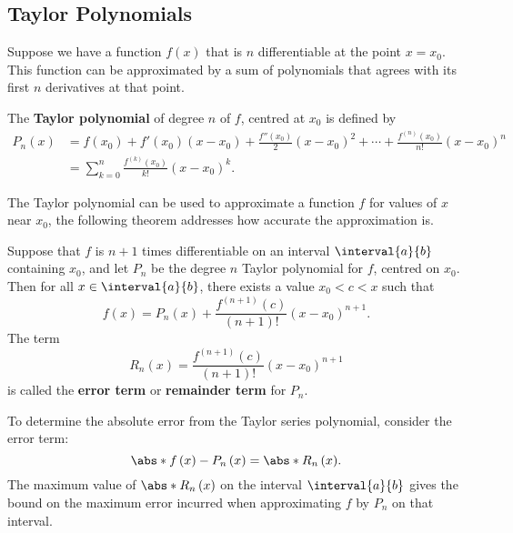\documentclass{article}
\begin{document}
\subsection{Taylor Polynomials}
Suppose we have a function \(f\left( x \right)\) that is \(n\) differentiable at the point
\(x = x_0\). This function can be approximated by a sum of polynomials that agrees with its first \(n\) derivatives at that point.
\begin{definition}
    The \textbf{Taylor polynomial} of degree \(n\) of \(f\), centred at \(x_0\) is defined by
    \begin{align*}
        P_n\left( x \right) & = f\left( x_0 \right) + f'\left( x_0 \right) \left( x - x_0 \right) + \frac{f''\left( x_0 \right)}{2} \left( x - x_0 \right)^2 + \cdots + \frac{f^{\left( n \right)} \left( x_0 \right)}{n!} \left( x - x_0 \right)^n \\
                            & = \sum_{k = 0}^n \frac{f^{\left( k \right)}\left( x_0 \right)}{k!} \left( x - x_0 \right)^k.
    \end{align*}
\end{definition}
The Taylor polynomial can be used to approximate a function \(f\) for values of \(x\) near \(x_0\), the following
theorem addresses how accurate the approximation is.
\begin{definition}
    Suppose that \(f\) is \(n + 1\) times differentiable on an interval \(\interval{a}{b}\) containing \(x_0\),
    and let \(P_n\) be the degree \(n\) Taylor polynomial for \(f\), centred on \(x_0\). Then for all \(x \in \interval{a}{b}\),
    there exists a value \(x_0 < c < x\) such that
    \begin{equation*}
        f\left( x \right) = P_n\left( x \right) + \frac{f^{\left( n + 1 \right)}\left( c \right)}{\left( n + 1 \right)!} \left( x - x_0 \right)^{n + 1}.
    \end{equation*}
    The term
    \begin{equation*}
        R_n\left( x \right) = \frac{f^{\left( n + 1 \right)}\left( c \right)}{\left( n + 1 \right)!} \left( x - x_0 \right)^{n + 1}
    \end{equation*}
    is called the \textbf{error term} or \textbf{remainder term} for \(P_n\).
\end{definition}
To determine the absolute error from the Taylor series polynomial, consider the error term:
\begin{equation*}
    \abs*{f\left( x \right) - P_n\left( x \right)} = \abs*{R_n\left( x \right)}.
\end{equation*}
The maximum value of \(\abs*{R_n\left( x \right)}\) on the interval \(\interval{a}{b}\) gives the bound on the maximum error incurred when approximating
\(f\) by \(P_n\) on that interval.
\end{document}

